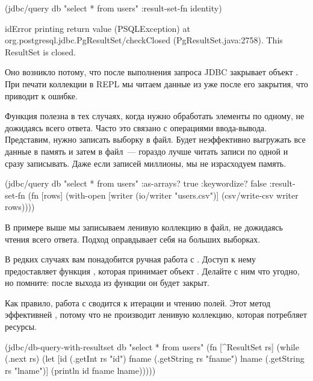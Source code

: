 \begin{english}
  \begin{clojure}
(jdbc/query db "select * from users" {:result-set-fn identity})

idError printing return value (PSQLException) at org.postgresql.jdbc.PgResultSet/checkClosed (PgResultSet.java:2758).
This ResultSet is closed.
  \end{clojure}
\end{english}

Оно возникло потому, что после выполнения запроса JDBC закрывает объект . При печати коллекции в REPL мы читаем данные из  уже после его закрытия, что приводит к ошибке.

Функция  полезна в тех случаях, когда нужно обработать элементы по одному, не дожидаясь всего ответа. Часто это связано с операциями ввода-вывода. Представим, нужно записать выборку в файл. Будет неэффективно выгружать все данные в память и затем в файл~--- гораздо лучше читать записи по одной и сразу записывать. Даже если записей миллионы, мы не израсходуем память.

\begin{english}
  \begin{clojure}
(jdbc/query db "select * from users"
            {:as-arrays? true
             :keywordize? false
             :result-set-fn
             (fn [rows]
               (with-open [writer (io/writer "users.csv")]
                 (csv/write-csv writer rows)))})
  \end{clojure}
\end{english}

В примере выше мы записываем ленивую коллекцию  в файл, не дожидаясь чтения всего ответа. Подход оправдывает себя на больших выборках.

В редких случаях вам понадобится ручная работа с . Доступ к нему предоставляет функция , которая принимает объект . Делайте с ним что угодно, но помните: после выхода из функции он будет закрыт.

Как правило, работа с  сводится к итерации  и чтению полей. Этот метод эффективней , потому что не производит ленивую коллекцию, которая потребляет ресурсы.

\begin{english}
  \begin{clojure}
(jdbc/db-query-with-resultset
 db "select * from users"
 (fn [^ResultSet rs]
   (while (.next rs)
     (let [id (.getInt rs "id")
           fname (.getString rs "fname")
           lname (.getString rs "lname")]
       (println id fname lname)))))
  \end{clojure}
\end{english}

